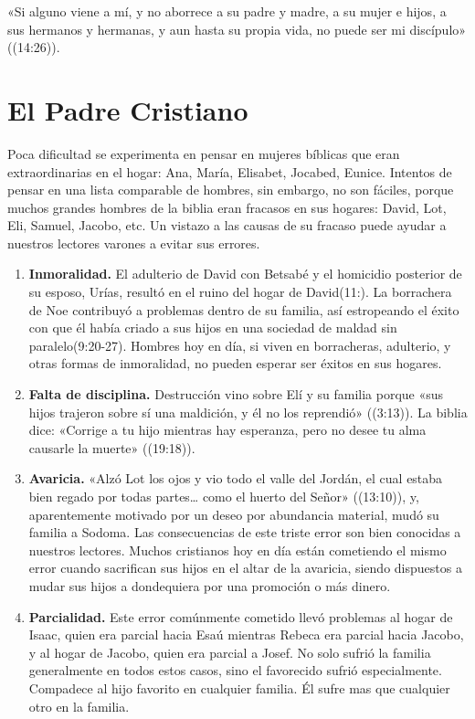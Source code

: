 \documentclass[12pt, twoside, openright]{book}
\begin{document}
«Si alguno viene a mí, y no aborrece a su padre y madre, a su mujer e hijos, a sus hermanos y hermanas, y aun hasta su propia vida, no puede ser mi discípulo» ((14:26)).

\section{El Padre Cristiano}
Poca dificultad se experimenta en pensar en mujeres bíblicas que eran extraordinarias en el hogar: Ana, María, Elisabet, Jocabed, Eunice. Intentos de pensar en una lista comparable de hombres, sin embargo, no son fáciles, porque muchos grandes hombres de la biblia eran fracasos en sus hogares: David, Lot, Eli, Samuel, Jacobo, etc. Un vistazo a las causas de su fracaso puede ayudar a nuestros lectores varones a evitar sus errores. 
\begin{enumerate}
\item\textbf{Inmoralidad.} El adulterio de David con Betsabé y el homicidio posterior de su esposo, Urías, resultó en el ruino del hogar de David(11:). La borrachera de Noe contribuyó a problemas dentro de su familia, así estropeando el éxito con que él había criado a sus hijos en una sociedad de maldad sin paralelo(9:20-27). Hombres hoy en día, si viven en borracheras, adulterio, y otras formas de inmoralidad, no pueden esperar ser éxitos en sus hogares.
\item\textbf{Falta de disciplina.} Destrucción vino sobre Elí y su familia porque «sus hijos trajeron sobre sí una maldición, y él no los reprendió» ((3:13)). La biblia dice: «Corrige a tu hijo mientras hay esperanza, pero no desee tu alma causarle la muerte» ((19:18)).
\item\textbf{Avaricia.} «Alzó Lot los ojos y vio todo el valle del Jordán, el cual estaba bien regado por todas partes… como el huerto del Señor» ((13:10)), y, aparentemente motivado por un deseo por abundancia material, mudó su familia a Sodoma. Las consecuencias de este triste error son bien conocidas a nuestros lectores. Muchos cristianos hoy en día están cometiendo el mismo error cuando sacrifican sus hijos en el altar de la avaricia, siendo dispuestos a mudar sus hijos a dondequiera por una promoción o más dinero.
\item\textbf{Parcialidad.} Este error comúnmente cometido llevó problemas al hogar de Isaac, quien era parcial hacia Esaú mientras Rebeca era parcial hacia Jacobo, y al hogar de Jacobo, quien era parcial a Josef. No solo sufrió la familia generalmente en todos estos casos, sino el favorecido sufrió especialmente. Compadece al hijo favorito en cualquier familia. Él sufre mas que cualquier otro en la familia.
\end{enumerate}
\end{document}
